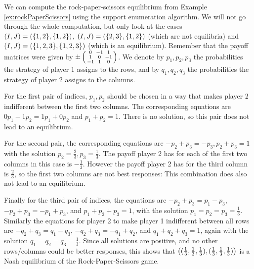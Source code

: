 \documentclass[a4paper]{scrreprt}
\begin{document}
    \begin{ex}
        We can compute the rock-paper-scissors equilibrium from Example \ref{ex:rockPaperScissors} using the support enumeration algorithm.
        We will not go through the whole computation, but only look at the cases $(I, J) = (\{1, 2\}, \{1, 2\})$, $(I, J) = (\{2, 3\}, \{1, 2\})$ (which are not equilibria) and $(I, J) = (\{1, 2, 3\}, \{1, 2, 3\})$ (which is an equilibrium). Remember that the payoff matrices were given by $\pm \left(\begin{smallmatrix}0 & -1 & 1 \\ 1 & 0 & -1 \\ -1 & 1 & 0\end{smallmatrix}\right)$. We denote by $p_1, p_2, p_3$ the probabilities the strategy of player 1 assigns to the rows, and by $q_1, q_2, q_3$ the probabilities the strategy of player 2 assigns to the columns.
        
        For the first pair of indices, $p_1, p_2$ should be chosen in a way that makes player 2 indifferent between the first two columns. The corresponding equations are $0p_1 - 1p_2 = 1p_1 + 0p_2$ and $p_1 + p_2 = 1$. There is no solution, so this pair does not lead to an equilibrium.
        
        For the second pair, the corresponding equations are $-p_2 + p_3 = -p_3, p_2 + p_3 = 1$ with the solution $p_2 = \frac{2}{3}, p_3 = \frac{1}{3}$. The payoff player 2 has for each of the first two columns in this case is $-\frac{1}{3}$. However the payoff player 2 has for the third column is $\frac{2}{3}$, so the first two columns are not best responses: This combination does also not lead to an equilibrium.
        
        Finally for the third pair of indices, the equations are $-p_2 + p_3 = p_1 - p_3$, $-p_2 + p_3 = -p_1 + p_3$, and $p_1 + p_2 + p_3 = 1$, with the solution $p_1 = p_2 = p_3 = \frac{1}{3}$. Similarly the equations for player 2 to make player 1 indifferent between all rows are $-q_2 + q_3 = q_1 - q_3$, $-q_2 + q_3 = -q_1 + q_2$, and $q_1 + q_2 + q_3 = 1$, again with the solution $q_1 = q_2 = q_3 = \frac{1}{3}$. Since all solutions are positive, and no other rows/columns could be better responses, this shows that $\left((\frac{1}{3}, \frac{1}{3}, \frac{1}{3}), (\frac{1}{3}, \frac{1}{3}, \frac{1}{3})\right)$ is a Nash equilibrium of the Rock-Paper-Scissors game.
    \end{ex}
    
\end{document}
